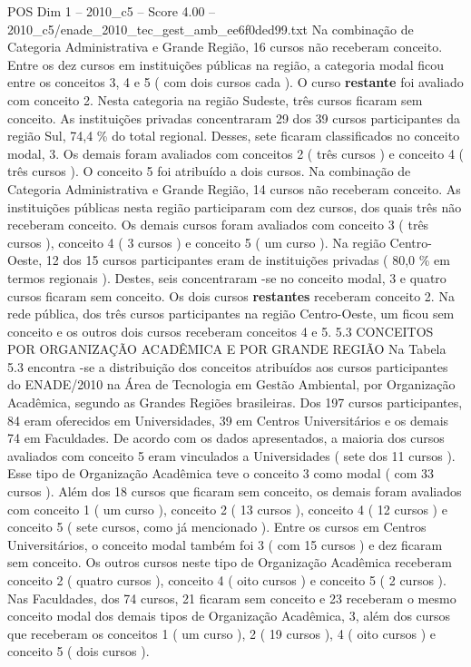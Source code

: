 \begin{textsample}{POS Dim 1 – 2010\_c5 – Score 4.00 – 2010\_c5/enade\_2010\_tec\_gest\_amb\_ee6f0ded99.txt}
Na combinação de Categoria Administrativa e Grande Região, 16 cursos não receberam conceito.
Entre os dez cursos em instituições públicas na região, a categoria modal ficou entre os conceitos 3, 4 e 5 ( com dois cursos cada ).
O curso \textbf{restante} foi avaliado com conceito 2.
Nesta categoria na região Sudeste, três cursos ficaram sem conceito.
As instituições privadas concentraram 29 dos 39 cursos participantes da região Sul, 74,4 \% do total regional.
Desses, sete ficaram classificados no conceito modal, 3.
Os demais foram avaliados com conceitos 2 ( três cursos ) e conceito 4 ( três cursos ).
O conceito 5 foi atribuído a dois cursos.
Na combinação de Categoria Administrativa e Grande Região, 14 cursos não receberam conceito.
As instituições públicas nesta região participaram com dez cursos, dos quais três não receberam conceito.
Os demais cursos foram avaliados com conceito 3 ( três cursos ), conceito 4 ( 3 cursos ) e conceito 5 ( um curso ).
Na região Centro-Oeste, 12 dos 15 cursos participantes eram de instituições privadas ( 80,0 \% em termos regionais ).
Destes, seis concentraram -se no conceito modal, 3 e quatro cursos ficaram sem conceito.
Os dois cursos \textbf{restantes} receberam conceito 2.
Na rede pública, dos três cursos participantes na região Centro-Oeste, um ficou sem conceito e os outros dois cursos receberam conceitos 4 e 5. 5.3 CONCEITOS POR ORGANIZAÇÃO ACADÊMICA E POR GRANDE REGIÃO Na Tabela 5.3 encontra -se a distribuição dos conceitos atribuídos aos cursos participantes do ENADE/2010 na Área de Tecnologia em Gestão Ambiental, por Organização Acadêmica, segundo as Grandes Regiões brasileiras.
Dos 197 cursos participantes, 84 eram oferecidos em Universidades, 39 em Centros Universitários e os demais 74 em Faculdades.
De acordo com os dados apresentados, a maioria dos cursos avaliados com conceito 5 eram vinculados a Universidades ( sete dos 11 cursos ).
Esse tipo de Organização Acadêmica teve o conceito 3 como modal ( com 33 cursos ).
Além dos 18 cursos que ficaram sem conceito, os demais foram avaliados com conceito 1 ( um curso ), conceito 2 ( 13 cursos ), conceito 4 ( 12 cursos ) e conceito 5 ( sete cursos, como já mencionado ).
Entre os cursos em Centros Universitários, o conceito modal também foi 3 ( com 15 cursos ) e dez ficaram sem conceito.
Os outros cursos neste tipo de Organização Acadêmica receberam conceito 2 ( quatro cursos ), conceito 4 ( oito cursos ) e conceito 5 ( 2 cursos ).
Nas Faculdades, dos 74 cursos, 21 ficaram sem conceito e 23 receberam o mesmo conceito modal dos demais tipos de Organização Acadêmica, 3, além dos cursos que receberam os conceitos 1 ( um curso ), 2 ( 19 cursos ), 4 ( oito cursos ) e conceito 5 ( dois cursos ).

\end{textsample}
